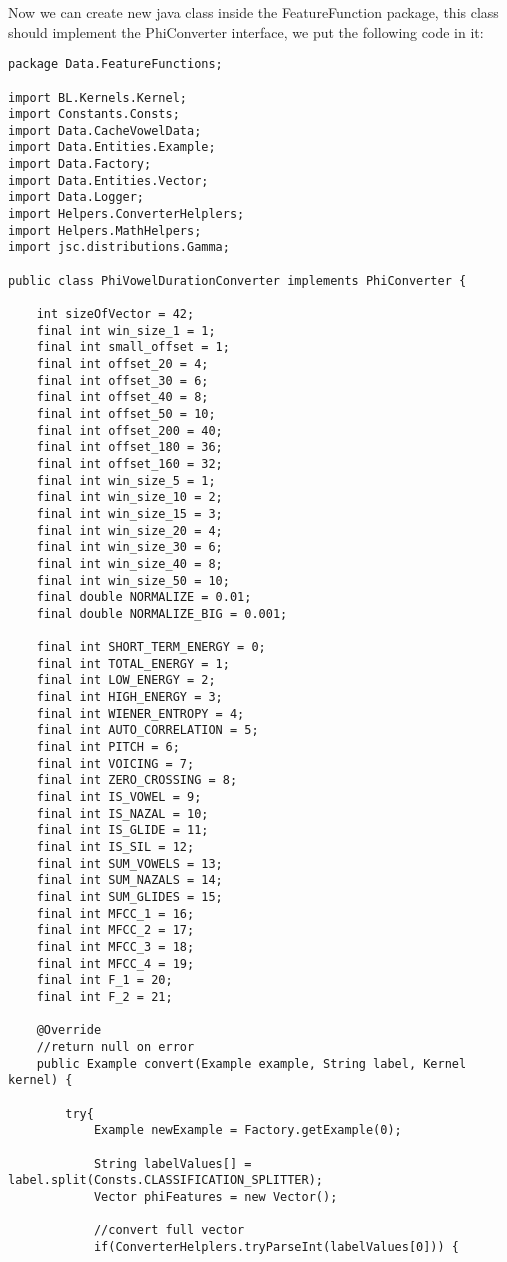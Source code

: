 \documentclass[11pt, oneside]{article}   	%
\begin{document}
Now we can create new java class inside the FeatureFunction package, this class should implement the PhiConverter interface, we put the following code in it:
\begin{lstlisting}
package Data.FeatureFunctions;

import BL.Kernels.Kernel;
import Constants.Consts;
import Data.CacheVowelData;
import Data.Entities.Example;
import Data.Factory;
import Data.Entities.Vector;
import Data.Logger;
import Helpers.ConverterHelplers;
import Helpers.MathHelpers;
import jsc.distributions.Gamma;

public class PhiVowelDurationConverter implements PhiConverter {

    int sizeOfVector = 42;
    final int win_size_1 = 1;
    final int small_offset = 1;
    final int offset_20 = 4;
    final int offset_30 = 6;
    final int offset_40 = 8;
    final int offset_50 = 10;
    final int offset_200 = 40;
    final int offset_180 = 36;
    final int offset_160 = 32;
    final int win_size_5 = 1;
    final int win_size_10 = 2;
    final int win_size_15 = 3;
    final int win_size_20 = 4;
    final int win_size_30 = 6;
    final int win_size_40 = 8;
    final int win_size_50 = 10;
    final double NORMALIZE = 0.01;
    final double NORMALIZE_BIG = 0.001;

    final int SHORT_TERM_ENERGY = 0;
    final int TOTAL_ENERGY = 1;
    final int LOW_ENERGY = 2;
    final int HIGH_ENERGY = 3;
    final int WIENER_ENTROPY = 4;
    final int AUTO_CORRELATION = 5;
    final int PITCH = 6;
    final int VOICING = 7;
    final int ZERO_CROSSING = 8;
    final int IS_VOWEL = 9;
    final int IS_NAZAL = 10;
    final int IS_GLIDE = 11;
    final int IS_SIL = 12;
    final int SUM_VOWELS = 13;
    final int SUM_NAZALS = 14;
    final int SUM_GLIDES = 15;
    final int MFCC_1 = 16;
    final int MFCC_2 = 17;
    final int MFCC_3 = 18;
    final int MFCC_4 = 19;
    final int F_1 = 20;
    final int F_2 = 21;

    @Override
    //return null on error
    public Example convert(Example example, String label, Kernel kernel) {

        try{
            Example newExample = Factory.getExample(0);

            String labelValues[] = label.split(Consts.CLASSIFICATION_SPLITTER);
            Vector phiFeatures = new Vector();

            //convert full vector
            if(ConverterHelplers.tryParseInt(labelValues[0])) {


\end{lstlisting}
\end{document}
